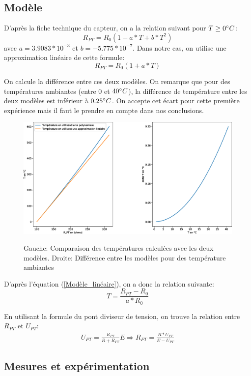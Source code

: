 \documentclass[12pt]{article}
\begin{document}
\subsection{Modèle}
D'après la fiche technique du capteur, on a la relation suivant pour $T\geq 0\degree C$:
\begin{equation}
R_{PT}=R_0(1+a*T+b*T^2)
\end{equation}
avec $a=3.9083*10^{-3}$ et $b=-5.775*10^{-7}$. Dans notre cas, on utilise une approximation linéaire de cette formule:
\begin{equation}
R_{PT}=R_0(1+a*T)
\label{Modèle_linéaire}
\end{equation}

On calcule la différence entre ces deux modèles. On remarque que pour des températures ambiantes (entre $0$ et $40\degree C$), la différence de température entre les deux modèles est inférieur à $0.25\degree C$. On accepte cet écart pour cette première expérience mais il faut le prendre en compte dans nos conclusions. 
\begin{figure}[h!]
	\begin{center}
		\includegraphics[scale=0.3]{Comparaison.eps}
		\label{Comparaison}
		\caption{Gauche: Comparaison des températures calculées avec les deux modèles. Droite: Différence entre les modèles pour des température ambiantes}
	\end{center}
\end{figure}

D'après l'équation (\ref{Modèle_linéaire}), on a donc la relation suivante:
\begin{equation}
T=\frac{R_{PT}-R_0}{a*R_0}
\label{Equation_température}
\end{equation}

En utilisant la formule du pont diviseur de tension, on trouve la relation entre $R_{PT}$ et $U_{PT}$:
\begin{align}
U_{PT}=\frac{R_{PT}}{R+R_{PT}}E \Rightarrow R_{PT}=\frac{R*U_{PT}}{E-U_{PT}}
\end{align}

\subsection{Mesures et expérimentation}
\end{document}
